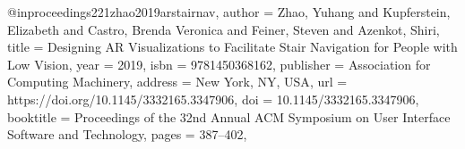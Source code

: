 @inproceedings{221zhao2019arstairnav,
author = {Zhao, Yuhang and Kupferstein, Elizabeth and Castro, Brenda Veronica and Feiner, Steven and Azenkot, Shiri},
title = {Designing AR Visualizations to Facilitate Stair Navigation for People with Low Vision},
year = {2019},
isbn = {9781450368162},
publisher = {Association for Computing Machinery},
address = {New York, NY, USA},
url = {https://doi.org/10.1145/3332165.3347906},
doi = {10.1145/3332165.3347906},
booktitle = {Proceedings of the 32nd Annual ACM Symposium on User Interface Software and Technology},
pages = {387–402},
}